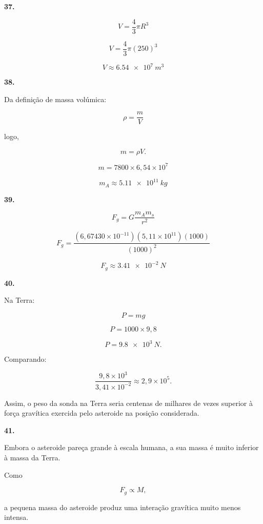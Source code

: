 \documentclass[11pt,a4paper]{article}
\begin{document}
	\begin{solucaobox}[Questões 37--41]
		
		\textbf{37.}
		
		\[
		V=
		\frac43\pi R^3
		\]
		
		\[
		V=
		\frac43\pi(250)^3
		\]
		
		\[
		\boxed{
			V\approx\SI{6.54e7}{m^3}
		}
		\]
		
		\vspace{3mm}
		
		\textbf{38.}
		
		Da definição de massa volúmica:
		
		\[
		\rho=\frac{m}{V}
		\]
		
		logo,
		
		\[
		m=\rho V.
		\]
		
		\[
		m=
		7800\times6{,}54\times10^7
		\]
		
		\[
		\boxed{
			m_A\approx\SI{5.11e11}{kg}
		}
		\]
		
		\vspace{3mm}
		
		\textbf{39.}
		
		\[
		F_g=
		G\frac{m_Am_s}{r^2}
		\]
		
		\[
		F_g=
		\frac{
			(6{,}67430\times10^{-11})
			(5{,}11\times10^{11})
			(1000)
		}{
			(1000)^2
		}
		\]
		
		\[
		\boxed{
			F_g\approx\SI{3.41e-2}{N}
		}
		\]
		
		\vspace{3mm}
		
		\textbf{40.}
		
		Na Terra:
		
		\[
		P=mg
		\]
		
		\[
		P=1000\times9{,}8
		\]
		
		\[
		P=
		\SI{9.8e3}{N}.
		\]
		
		Comparando:
		
		\[
		\frac{9{,}8\times10^3}
		{3{,}41\times10^{-2}}
		\approx
		2{,}9\times10^5.
		\]
		
		Assim, o peso da sonda na Terra seria centenas de milhares de vezes
		superior à força gravítica exercida pelo asteroide na posição considerada.
		
		\vspace{3mm}
		
		\textbf{41.}
		
		Embora o asteroide pareça grande à escala humana, a sua massa é muito
		inferior à massa da Terra.
		
		Como
		
		\[
		F_g\propto M,
		\]
		
		a pequena massa do asteroide produz uma interação gravítica muito menos
		intensa.
		
	\end{solucaobox}
	
\end{document}

